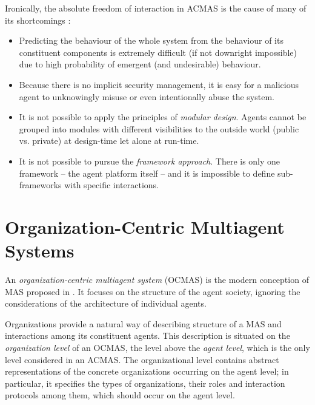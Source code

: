 Ironically, the absolute freedom of interaction in ACMAS is the cause of many of its shortcomings \cite{Ferber03}:
\begin{itemize}
	\item Predicting the behaviour of the whole system from the behaviour of its constituent components is extremely difficult (if not downright impossible) due to high probability of emergent (and undesirable) behaviour.
	\item Because there is no implicit security management, it is easy for a malicious agent to unknowingly misuse or even intentionally abuse the system.
	\item It is not possible to apply the principles of \textit{modular design}. Agents cannot be grouped into modules with different visibilities to the outside world (public vs. private) at design-time let alone at run-time.
	\item It is not possible to pursue the \textit{framework approach}. There is only one framework -- the agent platform itself -- and it is impossible to define sub-frameworks with specific interactions.
\end{itemize}

\section{Organization-Centric Multiagent Systems}

An \textit{organization-centric multiagent system} (OCMAS) is the modern conception of MAS proposed in \cite{Ferber03}.
It focuses on the structure of the agent society, ignoring the considerations of the architecture of individual agents.

Organizations provide a natural way of describing structure of a MAS and interactions among its constituent agents.
This description is situated on the \textit{organization level} of an OCMAS, the level above the \textit{agent level}, which is the only level considered in an ACMAS.
The organizational level contains abstract representations of the concrete organizations occurring on the agent level; in particular, it specifies the types of organizations, their roles and interaction protocols among them, which should occur on the agent level.

